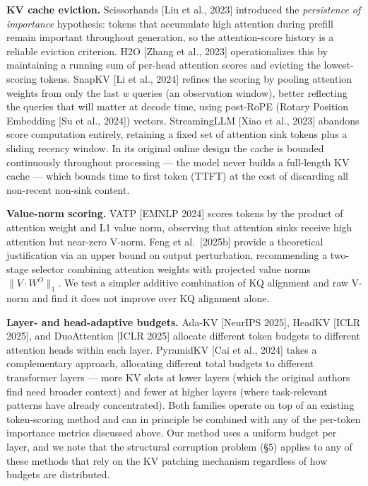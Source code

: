 \documentclass[10pt,letterpaper]{article}
\begin{document}
\textbf{KV cache eviction.} Scissorhands {[}Liu et al., 2023{]}
introduced the \emph{persistence of importance} hypothesis: tokens that
accumulate high attention during prefill remain important throughout
generation, so the attention-score history is a reliable eviction
criterion. H2O {[}Zhang et al., 2023{]} operationalizes this by
maintaining a running sum of per-head attention scores and evicting the
lowest-scoring tokens. SnapKV {[}Li et al., 2024{]} refines the scoring
by pooling attention weights from only the last \emph{w} queries (an
observation window), better reflecting the queries that will matter at
decode time, using post-RoPE (Rotary Position Embedding {[}Su et al., 2024{]}) vectors. StreamingLLM {[}Xiao et al.,
2023{]} abandons score computation entirely, retaining a fixed set of
attention sink tokens plus a sliding recency window. In its original
online design the cache is bounded continuously throughout processing
--- the model never builds a full-length KV cache --- which bounds time
to first token (TTFT) at the cost of discarding all non-recent
non-sink content.

\textbf{Value-norm scoring.} VATP {[}EMNLP 2024{]} scores tokens by the
product of attention weight and L1 value norm, observing that attention
sinks receive high attention but near-zero V-norm. Feng et
al.~{[}2025b{]} provide a theoretical justification via an upper bound
on output perturbation, recommending a two-stage selector combining
attention weights with projected value norms \(\|V \cdot W^O\|_1\). We
test a simpler additive combination of KQ alignment and raw V-norm and
find it does not improve over KQ alignment alone.

\textbf{Layer- and head-adaptive budgets.} Ada-KV {[}NeurIPS 2025{]},
HeadKV {[}ICLR 2025{]}, and DuoAttention {[}ICLR 2025{]} allocate
different token budgets to different attention heads within each layer.
PyramidKV {[}Cai et al., 2024{]} takes a complementary approach,
allocating different total budgets to different transformer layers ---
more KV slots at lower layers (which the original authors find need
broader context) and fewer at higher layers (where task-relevant
patterns have already concentrated). Both families operate on top of an
existing token-scoring method and can in principle be combined with any
of the per-token importance metrics discussed above. Our method uses a
uniform budget per layer, and we note that the structural corruption
problem (§5) applies to any of these methods that rely on the KV
patching mechanism regardless of how budgets are distributed.
\end{document}
